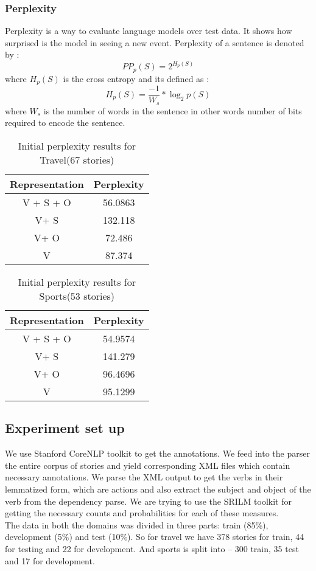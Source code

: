 \documentclass[12pt]{article}
\begin{document}
\subsubsection{Perplexity}
Perplexity is a way to evaluate language models over test data. It shows how surprised is the model in seeing a new event. Perplexity of a sentence is denoted by :
\begin{equation}
	PP_p(S) = 2^{H_p(S)}
\end{equation}
where $H_p(S)$ is the cross entropy and its defined as :
\begin{equation}
H_p(S) = \frac{-1}{W_s} * \log_2 p(S)
\end{equation}
where $W_s$ is the number of words in the sentence in other words number of bits required to encode the sentence.  \\
\begin{table}[H]
	\centering
	\begin{tabular}{|c|c|}
		\hline Representation  & Perplexity  \\ 
		\hline V + S + O & 56.0863  \\ 
		\hline  V+ S & 132.118 \\ 
		\hline  V+ O & 72.486 \\ 
		\hline  V & 87.374 \\ 
		\hline 
	\end{tabular} 
	\caption{Initial perplexity results for Travel(67 stories)}
\end{table}
\begin{table}[H]
	\centering
	\begin{tabular}{|c|c|}
		\hline Representation  & Perplexity  \\ 
		\hline V + S + O & 54.9574  \\ 
		\hline  V+ S & 141.279 \\ 
		\hline  V+ O & 96.4696 \\ 
		\hline  V & 95.1299 \\ 
		\hline 
	\end{tabular} 
	\caption{Initial perplexity results for Sports(53 stories)}
\end{table}
\subsection{Experiment set up}
We use Stanford CoreNLP\cite{corenlp} toolkit to get the annotations. We feed into the parser the entire corpus of stories and yield corresponding XML files which contain necessary annotations. We parse the XML output to get the verbs in their lemmatized form, which are actions and also extract the subject and object of the verb from the dependency parse. We are trying to use the SRILM toolkit for getting the necessary counts and probabilities for each of these measures\cite{srilm}. \\
The data in both the domains was divided in three parts:   train (85\%), development (5\%) and test (10\%). So for travel we have 378 stories for train, 44 for testing and 22 for development. And sports is split into – 300 train, 35 test and 17 for development.
\end{document}
